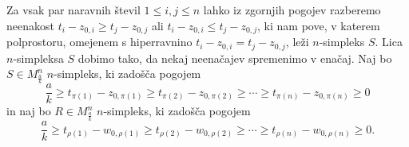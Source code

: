 \documentclass[mat1]{fmfdelo}
\newcommand{\0}{0}
\begin{document}
Za vsak par naravnih števil $1 \leq i, j \leq n$ lahko iz zgornjih pogojev razberemo neenakost $t_i - z_{0, i}  \geq t_j - z_{0, j}$ ali $t_i - z_{0, i}  \leq t_j - z_{0, j}$, ki nam pove, v katerem polprostoru, omejenem s hiperravnino $t_i - z_{0, i} = t_j - z_{0, j}$, leži $n$-simpleks $S$.
Lica $n$-simpleksa $S$ dobimo tako, da nekaj neenačajev spremenimo v enačaj. Naj bo $S \in M_{\frac{a}{k}}^n$ $n$-simpleks, ki zadošča pogojem
\begin{equation}\label{eq:pogojiS}
\frac{a}{k} \geq t_{\pi(1)} - z_{0, \pi(1)}  \geq t_{\pi(2)} - z_{0, \pi(2)} \geq \cdots \geq t_{\pi(n)} - z_{0, \pi(n)} \geq 0
\end{equation}
in naj bo $R \in M_{\frac{a}{k}}^n$ $n$-simpleks, ki zadošča pogojem
\begin{equation}\label{eq:pogojiR}
\frac{a}{k} \geq t_{\rho(1)} - w_{0, \rho(1)}  \geq t_{\rho(2)} - w_{0, \rho(2)} \geq \cdots \geq t_{\rho(n)} - w_{0, \rho(n)} \geq 0.
\end{equation}
\end{document}
